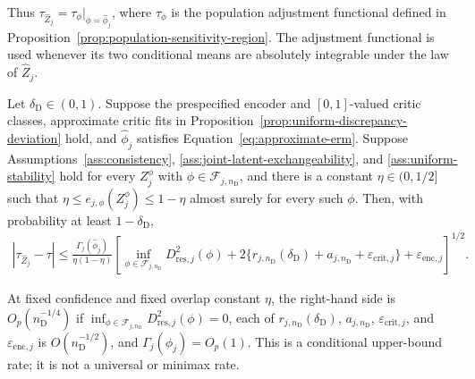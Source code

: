Thus $\tau_{\widehat Z_j}=\tau_\phi\big|_{\phi=\widehat\phi_j}$, where $\tau_\phi$ is the population adjustment functional defined in Proposition~\ref{prop:population-sensitivity-region}.
The adjustment functional is used whenever its two conditional means are absolutely integrable under the law of $\widehat Z_j$.

\begin{theorem}
\label{cor:representation-causal}
\normalfont

Let $\delta_{\mathrm D}\in(0,1)$. Suppose the prespecified encoder and $[0,1]$-valued critic classes, approximate critic fits in Proposition~\ref{prop:uniform-discrepancy-deviation} hold, and $\widehat\phi_j$ satisfies Equation~\eqref{eq:approximate-erm}. Suppose Assumptions~\ref{ass:consistency}, \ref{ass:joint-latent-exchangeability}, and \ref{ass:uniform-stability} hold for every $Z_j^\phi$ with $\phi\in\mathcal F_{j,n_{\mathrm D}}$, and there is a constant $\eta\in(0,1/2]$ such that $\eta\le e_{j,\phi}(Z_j^\phi)\le1-\eta$ almost surely for every such $\phi$. Then, with probability at least $1-\delta_{\mathrm D}$,
\begin{align}
	|\tau_{\widehat Z_j}-\tau|
	\le
	\frac{\Gamma_j(\widehat\phi_j)}{\eta(1-\eta)}
	\left[
	\inf_{\phi\in\mathcal F_{j,n_{\mathrm D}}}D_{\mathrm{res},j}^2(\phi)
	+2\{r_{j,n_{\mathrm D}}(\delta_{\mathrm D})+a_{j,n_{\mathrm D}}+\varepsilon_{\mathrm{crit},j}\}
	+\varepsilon_{\mathrm{enc},j}
	\right]^{1/2}.
	\label{eq:representation-oracle-causal}
\end{align}
\end{theorem}
At fixed confidence and fixed overlap constant $\eta$, the right-hand side is $O_p(n_{\mathrm D}^{-1/4})$ if $\inf_{\phi\in\mathcal F_{j,n_{\mathrm D}}}D_{\mathrm{res},j}^2(\phi)=0$, each of $r_{j,n_{\mathrm D}}(\delta_{\mathrm D})$, $a_{j,n_{\mathrm D}}$, $\varepsilon_{\mathrm{crit},j}$, and $\varepsilon_{\mathrm{enc},j}$ is $O(n_{\mathrm D}^{-1/2})$, and $\Gamma_j(\widehat\phi_j)=O_p(1)$. This is a conditional upper-bound rate; it is not a universal or minimax rate.

